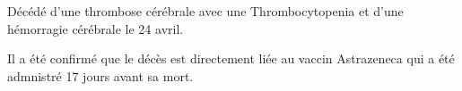 Décédé d'une thrombose cérébrale avec une Thrombocytopenia et d'une hémorragie
cérébrale le 24 avril.

Il a été confirmé que le décès est directement liée au vaccin Astrazeneca qui a
été admnistré 17 jours avant sa mort.

